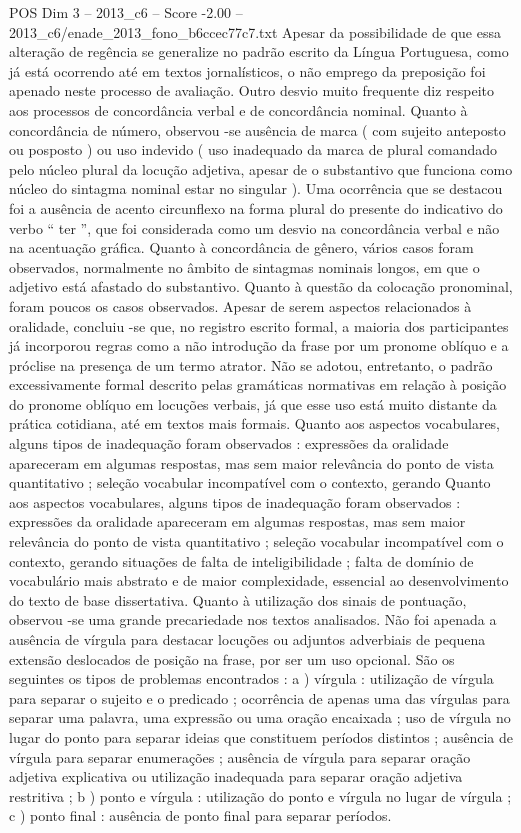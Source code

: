 \begin{textsample}{POS Dim 3 – 2013\_c6 – Score -2.00 – 2013\_c6/enade\_2013\_fono\_b6ccec77c7.txt}
Apesar da possibilidade de que essa alteração de regência se generalize no padrão escrito da Língua Portuguesa, como já está ocorrendo até em textos jornalísticos, o não emprego da preposição foi apenado neste processo de avaliação.
Outro desvio muito frequente diz respeito aos processos de concordância verbal e de concordância nominal.
Quanto à concordância de número, observou -se ausência de marca ( com sujeito anteposto ou posposto ) ou uso indevido ( uso inadequado da marca de plural comandado pelo núcleo plural da locução adjetiva, apesar de o substantivo que funciona como núcleo do sintagma nominal estar no singular ).
Uma ocorrência que se destacou foi a ausência de acento circunflexo na forma plural do presente do indicativo do verbo “ ter ”, que foi considerada como um desvio na concordância verbal e não na acentuação gráfica.
Quanto à concordância de gênero, vários casos foram observados, normalmente no âmbito de sintagmas nominais longos, em que o adjetivo está afastado do substantivo.
Quanto à questão da colocação pronominal, foram poucos os casos observados.
Apesar de serem aspectos relacionados à oralidade, concluiu -se que, no registro escrito formal, a maioria dos participantes já incorporou regras como a não introdução da frase por um pronome oblíquo e a próclise na presença de um termo atrator.
Não se adotou, entretanto, o padrão excessivamente formal descrito pelas gramáticas normativas em relação à posição do pronome oblíquo em locuções verbais, já que esse uso está muito distante da prática cotidiana, até em textos mais formais.
Quanto aos aspectos vocabulares, alguns tipos de inadequação foram observados : expressões da oralidade apareceram em algumas respostas, mas sem maior relevância do ponto de vista quantitativo ; seleção vocabular incompatível com o contexto, gerando Quanto aos aspectos vocabulares, alguns tipos de inadequação foram observados : expressões da oralidade apareceram em algumas respostas, mas sem maior relevância do ponto de vista quantitativo ; seleção vocabular incompatível com o contexto, gerando situações de falta de inteligibilidade ; falta de domínio de vocabulário mais abstrato e de maior complexidade, essencial ao desenvolvimento do texto de base dissertativa.
Quanto à utilização dos sinais de pontuação, observou -se uma grande precariedade nos textos analisados.
Não foi apenada a ausência de vírgula para destacar locuções ou adjuntos adverbiais de pequena extensão deslocados de posição na frase, por ser um uso opcional.
São os seguintes os tipos de problemas encontrados : a ) vírgula : utilização de vírgula para separar o sujeito e o predicado ; ocorrência de apenas uma das vírgulas para separar uma palavra, uma expressão ou uma oração encaixada ; uso de vírgula no lugar do ponto para separar ideias que constituem períodos distintos ; ausência de vírgula para separar enumerações ; ausência de vírgula para separar oração adjetiva explicativa ou utilização inadequada para separar oração adjetiva restritiva ; b ) ponto e vírgula : utilização do ponto e vírgula no lugar de vírgula ; c ) ponto final : ausência de ponto final para separar períodos.

\end{textsample}

